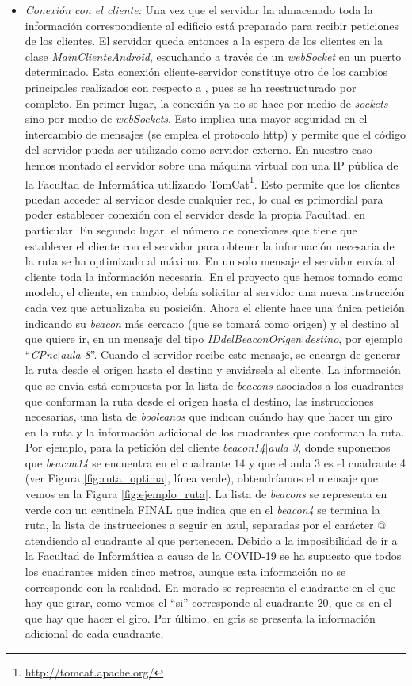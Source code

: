 \begin{itemize}
	\item \textit{Conexión con el cliente:} Una vez que el servidor ha almacenado toda la información correspondiente al edificio está preparado para recibir peticiones de los clientes. El servidor queda entonces a la espera de los clientes en la clase \textit{MainClienteAndroid}, escuchando a través de un \textit{webSocket} en un puerto determinado. Esta conexión cliente-servidor constituye otro de los cambios principales realizados con respecto a \cite{TFGguia}, pues se ha reestructurado por completo. En primer lugar, la conexión ya no se hace por medio de \textit{sockets} sino por medio de \textit{webSockets}. Esto implica una mayor seguridad en el intercambio de mensajes (se emplea el protocolo http) y permite que el código del servidor pueda ser utilizado como servidor externo. En nuestro caso hemos montado el servidor sobre una máquina virtual con una IP pública de la Facultad de Informática utilizando TomCat\footnote{\url{http://tomcat.apache.org/}}. Esto permite que los clientes puedan acceder al servidor desde cualquier red, lo cual es primordial para poder establecer conexión con el servidor desde la propia Facultad, en particular. En segundo lugar, el número de conexiones que tiene que establecer el cliente con el servidor para obtener la información necesaria de la ruta se ha optimizado al máximo. En un solo mensaje el servidor envía al cliente toda la información necesaria. En el proyecto que hemos tomado como modelo, el cliente, en cambio, debía solicitar al servidor una nueva instrucción cada vez que actualizaba su posición. Ahora el cliente hace una única petición indicando su \textit{beacon} más cercano (que se tomará como origen) y el destino al que quiere ir, en un mensaje del tipo \textit{IDdelBeaconOrigen$|$destino}, por ejemplo ``\textit{CPne$|$aula 8}''. Cuando el servidor recibe este mensaje, se encarga de generar la ruta desde el origen hasta el destino y enviársela al cliente. La información que se envía está compuesta por la lista de \textit{beacons} asociados a los cuadrantes que conforman la ruta desde el origen hasta el destino, las instrucciones necesarias, una lista de \textit{booleanos} que indican cuándo hay que hacer un giro en la ruta y la información adicional de los cuadrantes que conforman la ruta. Por ejemplo, para la petición del cliente \textit{beacon14$|$aula 3}, donde suponemos que \textit{beacon14} se encuentra en el cuadrante $14$ y que el aula 3 es el cuadrante 4 (ver Figura \ref{fig:ruta_optima}, línea verde), obtendríamos el mensaje que vemos en la Figura \ref{fig:ejemplo_ruta}. La lista de \textit{beacons} se representa en verde con un centinela FINAL que indica que en el \textit{beacon4} se termina la ruta, la lista de instrucciones a seguir en azul, separadas por el carácter @ atendiendo al cuadrante al que pertenecen. Debido a la imposibilidad de ir a la Facultad de Informática a causa de la COVID-19 se ha supuesto que todos los cuadrantes miden cinco metros, aunque esta información no se corresponde con la realidad. En morado se representa el cuadrante en el que hay que girar, como vemos el ``si'' corresponde al cuadrante $20$, que es en el que hay que hacer el giro. Por último, en gris se presenta la información adicional de cada cuadrante, 
\end{itemize}
